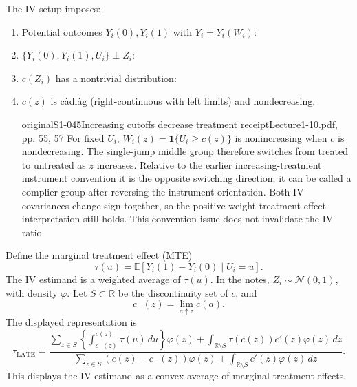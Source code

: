 The IV setup imposes:
\begin{enumerate}
 \item Potential outcomes $Y_i(0),Y_i(1)$ with $Y_i=Y_i(W_i)$: 
 \item $\{Y_i(0),Y_i(1),U_i\}\perp Z_i$: 
 \item $c(Z_i)$ has a nontrivial distribution: 
 \item $c(z)$ is c\`adl\`ag (right-continuous with left limits) and nondecreasing. 
\begin{reviewnote}{original}{S1-045}{Increasing cutoffs decrease treatment receipt}{Lecture1-10.pdf, pp. 55, 57}
For fixed $U_i$, $W_i(z)=\mathbf1\{U_i\ge c(z)\}$ is nonincreasing when $c$ is nondecreasing. The single-jump middle group therefore switches from treated to untreated as $z$ increases. Relative to the earlier increasing-treatment instrument convention it is the opposite switching direction; it can be called a complier group after reversing the instrument orientation. Both IV covariances change sign together, so the positive-weight treatment-effect interpretation still holds. This convention issue does not invalidate the IV ratio.
\end{reviewnote}

\end{enumerate}


Define the marginal treatment effect (MTE)
\[
 \tau(u)=\mathbb E[Y_i(1)-Y_i(0)\mid U_i=u].\tag{10.6}
\]
The IV estimand is a weighted average of $\tau(u)$. In the notes, $Z_i\sim\mathcal N(0,1)$, with density $\varphi$. Let $S\subset\mathbb R$ be the discontinuity set of $c$, and
\[
 c_-(z)=\lim_{a\uparrow z}c(a).
\]
The displayed representation is
\[
 \tau_{\mathrm{LATE}}=
 \frac{\displaystyle\sum_{z\in S}
 \left\{\int_{c_-(z)}^{c(z)}\tau(u)\,du\right\}\varphi(z)
 +\int_{\mathbb R\setminus S}\tau(c(z))c'(z)\varphi(z)\,dz}
 {\displaystyle\sum_{z\in S}(c(z)-c_-(z))\varphi(z)
 +\int_{\mathbb R\setminus S}c'(z)\varphi(z)\,dz}.
\]
This displays the IV estimand as a convex average of marginal treatment effects.

